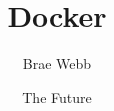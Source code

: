 \documentclass{csse4400}
\title{Docker}
\author{Brae Webb}
\date{{\color{red} The Future}}
\begin{document}
\makecover






\end{document}

